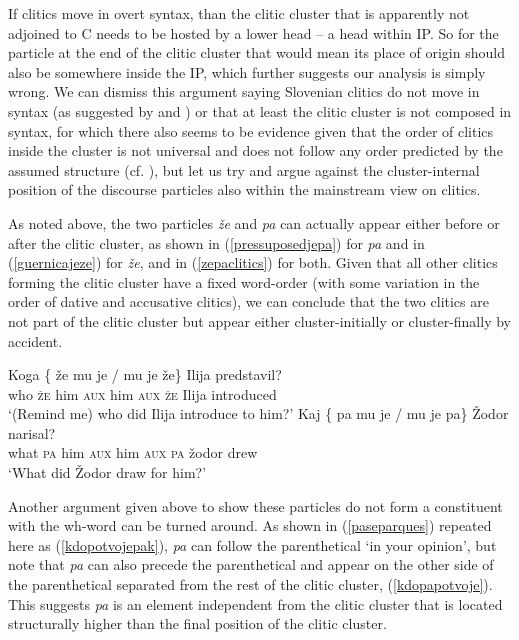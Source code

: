 \documentclass[output=paper,
modfonts,
newtxmath,
hidelinks
]{langscibook}
\begin{document}
\noindent If clitics move in overt syntax, than the clitic cluster that is apparently not adjoined to C needs to be hosted by a lower head -- a head within IP. So for the particle at the end of the clitic cluster that would mean its place of origin should also be somewhere inside the IP, which  further suggests our analysis is simply wrong. We can dismiss this argument saying Slovenian clitics do not move in syntax (as suggested by \citealt{marusic2008clitics} and \citealt{marusiczaucer2017brno}) or that at least the clitic cluster is not composed in syntax, for which there also seems to be evidence given that the order of clitics inside the cluster is not universal and does not follow any order predicted by the assumed structure (cf. \citealt{marusiclecturenotes}), but let us try and argue against the cluster-internal position of the discourse particles also within the mainstream view on clitics. 

As noted above, the two particles \textit{že} and \textit{pa} can actually appear either before or after the clitic cluster, as shown in (\ref{pressuposedjepa}) for \textit{pa} and in (\ref{guernicajeze}) for \textit{že}, and in (\ref{zepaclitics}) for both. Given that all other clitics forming the clitic cluster have a fixed word-order (with some variation in the order of dative and accusative clitics), we can conclude that the two clitics are not part of the clitic cluster but appear either cluster-initially or cluster-finally by accident.

\begin{exe}
\ex \label{zepaclitics}
\begin{xlist}
\ex \gll 
Koga \{\hspace{-2pt} že mu je / mu je že\} Ilija predstavil?\\
who {} \textsc{že} him \textsc{aux} {} him \textsc{aux} \textsc{že} Ilija introduced\\
\trans 	 `(Remind me) who did Ilija introduce to him?'
\ex	\gll Kaj \{\hspace{-2pt} pa mu je / mu je pa\} Žodor narisal?\\
 		what {} \textsc{pa} him \textsc{aux} {} him \textsc{aux} \textsc{pa} žodor drew\\
\trans 	 `What did Žodor draw for him?'
\end{xlist}
\end{exe}

\noindent Another argument given above to show these particles do not form a constituent with the wh-word can be turned around. As shown in (\ref{paseparques}) repeated here as (\ref{kdopotvojepak}), \textit{pa} can follow the parenthetical `in your opinion', but note that \textit{pa} can also precede the parenthetical and appear on the other side of the parenthetical separated from the rest of the clitic cluster, (\ref{kdopapotvoje}). This suggests \textit{pa} is an element independent from the clitic cluster that is located structurally higher than the final position of the clitic cluster.
\end{document}
